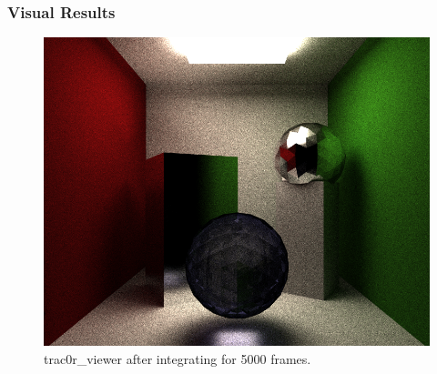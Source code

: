 \documentclass{beamer}
\begin{document}
\begin{frame}[shrink]
\begin{figure}[H]
        \centering
    \end{figure}
\end{frame}

\begin{frame}[shrink]
    \frametitle{Visual Results}
    \begin{figure}[H]
        \includegraphics[scale=0.5]{trac0r-5000.png}
        \centering
        \caption{trac0r\_viewer after integrating for 5000 frames.}
    \end{figure}
\end{frame}
\end{document}
